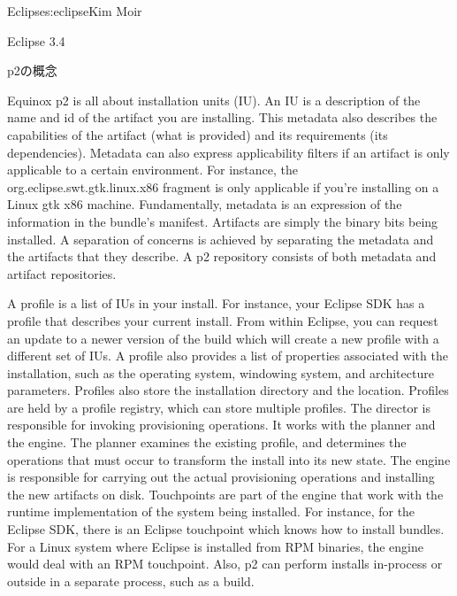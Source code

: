 \begin{aosachapter}{Eclipse}{s:eclipse}{Kim Moir}
\begin{aosasect1}{Eclipse 3.4}
\begin{aosasect2}{p2の概念}

Equinox p2 is all about installation units (IU). An IU is a
description of the name and id of the artifact you are
installing. This metadata also describes the capabilities of the
artifact (what is provided) and its requirements (its
dependencies). Metadata can also express applicability filters if an
artifact is only applicable to a certain environment. For instance,
the org.eclipse.swt.gtk.linux.x86 fragment is only applicable if
you're installing on a Linux gtk x86 machine. Fundamentally, metadata
is an expression of the information in the bundle's
manifest. Artifacts are simply the binary bits being installed. A
separation of concerns is achieved by separating the metadata and the
artifacts that they describe. A p2 repository consists of both
metadata and artifact repositories.


A profile is a list of IUs in your install. For instance, your Eclipse
SDK has a profile that describes your current install. From within
Eclipse, you can request an update to a newer version of the build
which will create a new profile with a different set of IUs. A profile
also provides a list of properties associated with the installation,
such as the operating system, windowing system, and architecture
parameters. Profiles also store the installation directory and the
location. Profiles are held by a profile registry, which can store
multiple profiles. The director is responsible for invoking
provisioning operations. It works with the planner and the engine. The
planner examines the existing profile, and determines the operations
that must occur to transform the install into its new state. The
engine is responsible for carrying out the actual provisioning
operations and installing the new artifacts on disk.  Touchpoints are
part of the engine that work with the runtime implementation of the
system being installed. For instance, for the Eclipse SDK, there is an
Eclipse touchpoint which knows how to install bundles. For a Linux
system where Eclipse is installed from RPM binaries, the engine would
deal with an RPM touchpoint. Also, p2 can perform installs in-process
or outside in a separate process, such as a build.


\end{aosasect2}
\end{aosasect1}
\end{aosachapter}
